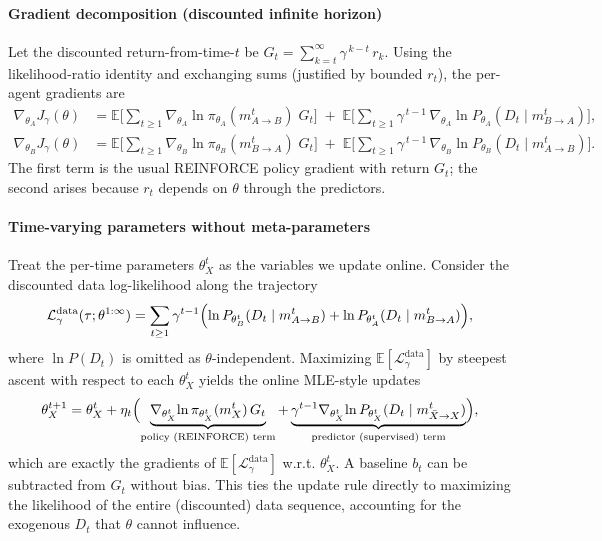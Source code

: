 \documentclass{article}
\begin{document}
\paragraph{Gradient decomposition (discounted infinite horizon)}
Let the discounted return-from-time-$t$ be $G_t=\sum_{k=t}^{\infty} \gamma^{\,k-t}\, r_k$. Using the likelihood-ratio identity and exchanging sums (justified by bounded $r_t$), the per-agent gradients are
\begin{align*}
\nabla_{\theta_A} J_{\gamma}(\theta)
&= \mathbb{E}\Biggl[ \sum_{t\ge 1} \nabla_{\theta_A}\ln\pi_{\theta_A}(m_{A\to B}^t)\; G_t \Biggr]
  \; + \; \mathbb{E}\Biggl[ \sum_{t\ge 1} \gamma^{\,t-1}\, \nabla_{\theta_A}\ln P_{\theta_A}(D_t\mid m_{B\to A}^t) \Biggr],\\
\nabla_{\theta_B} J_{\gamma}(\theta)
&= \mathbb{E}\Biggl[ \sum_{t\ge 1} \nabla_{\theta_B}\ln\pi_{\theta_B}(m_{B\to A}^t)\; G_t \Biggr]
  \; + \; \mathbb{E}\Biggl[ \sum_{t\ge 1} \gamma^{\,t-1}\, \nabla_{\theta_B}\ln P_{\theta_B}(D_t\mid m_{A\to B}^t) \Biggr].
\end{align*}
The first term is the usual REINFORCE policy gradient with return $G_t$; the second arises because $r_t$ depends on $\theta$ through the predictors.

\paragraph{Time-varying parameters without meta-parameters}
Treat the per-time parameters $\theta_X^t$ as the variables we update online. Consider the discounted data log-likelihood along the trajectory
\[
  \mathcal{L}_\gamma^{\mathrm{data}}(\tau; \theta^{1:\infty}) 
  = \sum_{t\ge 1} \gamma^{t-1} \Bigl( \ln P_{\theta_B^{t}}(D_t\mid m_{A\to B}^t) + \ln P_{\theta_A^{t}}(D_t\mid m_{B\to A}^t) \Bigr),
\]
where $\ln P(D_t)$ is omitted as $\theta$-independent. Maximizing $\mathbb{E}[\mathcal{L}_\gamma^{\mathrm{data}}]$ by steepest ascent with respect to each $\theta_X^{t}$ yields the online MLE-style updates
\[
  \theta_X^{t+1} 
  = \theta_X^{t} 
  + \eta_t \Bigl( \underbrace{\nabla_{\theta_X^{t}}\!\ln\pi_{\theta_X^{t}}(m_X^t)\, G_t}_{\text{policy (REINFORCE) term}} 
    + \underbrace{\gamma^{t-1} \nabla_{\theta_X^{t}}\!\ln P_{\theta_X^{t}}(D_t\mid m_{\bar X\to X}^t)}_{\text{predictor (supervised) term}} \Bigr),
\]
which are exactly the gradients of $\mathbb{E}[\mathcal{L}_\gamma^{\mathrm{data}}]$ w.r.t. $\theta_X^{t}$. A baseline $b_t$ can be subtracted from $G_t$ without bias. This ties the update rule directly to maximizing the likelihood of the entire (discounted) data sequence, accounting for the exogenous $D_t$ that $\theta$ cannot influence.
\end{document}
